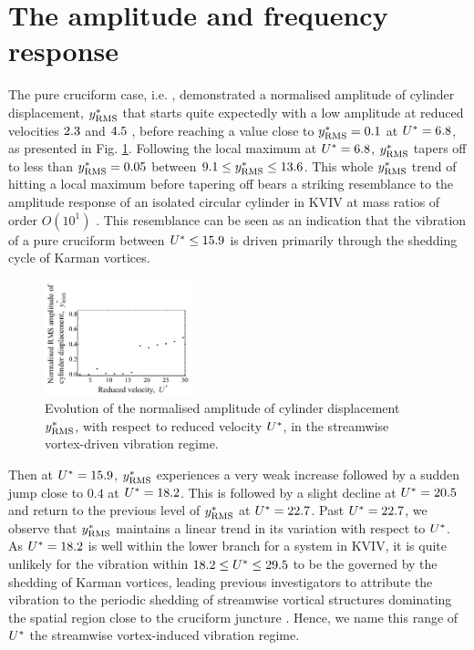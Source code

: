 \documentclass[oneside]{utmthesis}
\begin{document}
\section{The amplitude and frequency response}\label{sec:svivRegimeAmpFreqResp}

The pure cruciform case, i.e. \angfi{}, demonstrated a normalised \rms{} amplitude of cylinder displacement, $y^{*}_{\text{RMS}}$ that starts quite expectedly with a low amplitude at reduced velocities $2.3$ and $4.5$ , before reaching a value close to $y^{*}_{\text{RMS}} = 0.1$ at $U^{*} = 6.8$, as presented in Fig. \ref{fig:yStrRMS1}. Following the local maximum at $U^{*} = 6.8$, $y^{*}_{\text{RMS}}$ tapers off to less than $y^{*}_{\text{RMS}} = 0.05$ between $9.1 \leq y^{*}_{\text{RMS}} \leq 13.6$. This whole $y^{*}_{\text{RMS}}$ trend of hitting a local maximum before tapering off bears a striking resemblance to the amplitude response of an isolated circular cylinder in KVIV at mass ratios of order $O(10^{1})$ \citep{Feng1963,Khalak1999}. This resemblance can be seen as an indication that the vibration of a pure cruciform between $U^{*} \leq 15.9$ is driven primarily through the shedding cycle of Karman vortices.

\begin{figure}
  \centering
  \includegraphics[width=0.38\textwidth]{figs/yStrRMS1}
  \caption{Evolution of the normalised \rms{} amplitude of cylinder displacement $y^{*}_{\text{RMS}}$, with respect to reduced velocity $U^{*}$, in the streamwise vortex-driven vibration regime.} \label{fig:yStrRMS1}
\end{figure}

Then at $U^{*} = 15.9$, $y^{*}_{\text{RMS}}$ experiences a very weak increase followed by a sudden jump close to $0.4$ at $U^{*} = 18.2$. This is followed by a slight decline at $U^{*} = 20.5$ and return to the previous level of $y^{*}_{\text{RMS}}$ at $U^{*} = 22.7$. Past $U^{*} = 22.7$, we observe that $y^{*}_{\text{RMS}}$ maintains a linear trend in its variation with respect to $U^{*}$. As $U^{*} = 18.2$ is well within the lower branch for a system in KVIV, it is quite unlikely for the vibration within $18.2 \leq U^{*} \leq 29.5$ to be the governed by the shedding of Karman vortices, leading previous investigators to attribute the vibration to the periodic shedding of streamwise vortical structures dominating the spatial region close to the cruciform juncture \citep{Shirakashi1989,Hemsuwan2018b,Hemsuwan2018d}. Hence, we name this range of $U^{*}$ the streamwise vortex-induced vibration regime.
\end{document}
